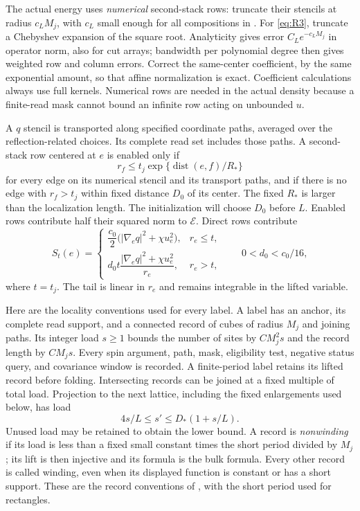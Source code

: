 The actual energy uses \emph{numerical} second-stack rows: truncate their
stencils at radius $c_LM_j$, with $c_L$ small enough for all compositions
in \cite[Section ``The energy identity and the massive Gaussian'' and
Appendix ``Local sector factors and their complete supports'']{SharpO4}.
For \eqref{eq:R3}, truncate a Chebyshev expansion of the square root.
Analyticity gives error $C_Le^{-c_LM_j}$ in operator norm, also for cut
arrays; bandwidth per polynomial degree then gives weighted row and
column errors.  Correct the same-center coefficient, by the same
exponential amount, so that affine normalization is exact.  Coefficient
calculations always use full kernels.  Numerical rows are needed in the
actual density because a finite-read mask cannot bound an infinite row
acting on unbounded $u$.

A $q$ stencil is transported along specified coordinate paths, averaged
over the reflection-related choices.  Its complete read set includes
those paths.  A second-stack row centered at $e$ is enabled only if
\[
 r_f\le t_j\exp\{\operatorname{dist}(e,f)/R_*\}
\]
for every edge on its numerical stencil and its transport paths, and if
there is no edge with $r_f>t_j$ within fixed distance $D_0$ of its
center.  The fixed $R_*$ is larger than the localization length.  The
initialization will choose $D_0$ before $L$.  Enabled rows contribute
half their squared norm to $\mathcal E$.  Direct rows contribute
\begin{equation}
 S_t(e)=
 \begin{cases}
 \dfrac{c_0}{2}\bigl(|\nabla_eq|^2+\chi u_e^2\bigr),&r_e\le t,\\[2mm]
 d_0t\dfrac{|\nabla_eq|^2+\chi u_e^2}{r_e},&r_e>t,
 \end{cases}
 \qquad 0<d_0<c_0/16,
 \label{eq:R4}
\end{equation}
where $t=t_j$.  The tail is linear in $r_e$ and remains integrable in
the lifted variable.

Here are the locality conventions used for every label.  A label has an
anchor, its complete read support, and a connected record of cubes of
radius $M_j$ and joining paths.  Its integer load $s\ge1$ bounds the
number of sites by $CM_j^2s$ and the record length by $CM_js$.
Every spin argument, path, mask, eligibility test, negative status query,
and covariance window is recorded.  A finite-period label retains its
lifted record before folding.  Intersecting records can be joined at a
fixed multiple of total load.  Projection to the next lattice, including
the fixed enlargements used below, has load
\begin{equation}
               4s/L\le s'\le D_*(1+s/L).
 \label{eq:rg-load-projection}
\end{equation}
Unused load may be retained to obtain the lower bound.  A record is
\emph{nonwinding} if its load is less than a fixed small constant times
the short period divided by $M_j$; its lift is then injective and its
formula is the bulk formula.  Every other record is called winding,
even when its displayed function is constant or has a short support.
These are the record conventions of
\cite[Section ``Scales, observation, and the class of densities'']{SharpO4},
with the short period used for rectangles.

